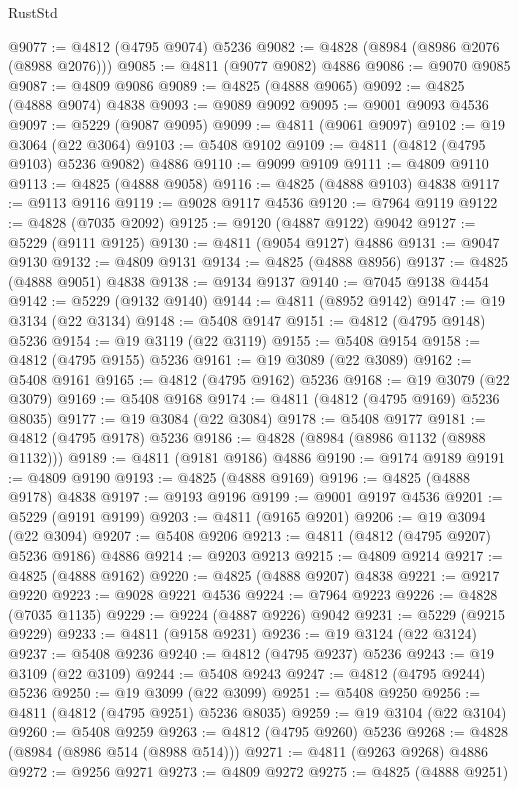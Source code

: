 \begin{lexlean}{RustStd}
\begin{coremodule}
@9077 := @4812 (@4795 @9074) @5236
@9082 := @4828 (@8984 (@8986 @2076 (@8988 @2076)))
@9085 := @4811 (@9077 @9082) @4886
@9086 := @9070 @9085
@9087 := @4809 @9086
@9089 := @4825 (@4888 @9065)
@9092 := @4825 (@4888 @9074) @4838
@9093 := @9089 @9092
@9095 := @9001 @9093 @4536
@9097 := @5229 (@9087 @9095)
@9099 := @4811 (@9061 @9097)
@9102 := @19 @3064 (@22 @3064)
@9103 := @5408 @9102
@9109 := @4811 (@4812 (@4795 @9103) @5236 @9082) @4886
@9110 := @9099 @9109
@9111 := @4809 @9110
@9113 := @4825 (@4888 @9058)
@9116 := @4825 (@4888 @9103) @4838
@9117 := @9113 @9116
@9119 := @9028 @9117 @4536
@9120 := @7964 @9119
@9122 := @4828 (@7035 @2092)
@9125 := @9120 (@4887 @9122) @9042
@9127 := @5229 (@9111 @9125)
@9130 := @4811 (@9054 @9127) @4886
@9131 := @9047 @9130
@9132 := @4809 @9131
@9134 := @4825 (@4888 @8956)
@9137 := @4825 (@4888 @9051) @4838
@9138 := @9134 @9137
@9140 := @7045 @9138 @4454
@9142 := @5229 (@9132 @9140)
@9144 := @4811 (@8952 @9142)
@9147 := @19 @3134 (@22 @3134)
@9148 := @5408 @9147
@9151 := @4812 (@4795 @9148) @5236
@9154 := @19 @3119 (@22 @3119)
@9155 := @5408 @9154
@9158 := @4812 (@4795 @9155) @5236
@9161 := @19 @3089 (@22 @3089)
@9162 := @5408 @9161
@9165 := @4812 (@4795 @9162) @5236
@9168 := @19 @3079 (@22 @3079)
@9169 := @5408 @9168
@9174 := @4811 (@4812 (@4795 @9169) @5236 @8035)
@9177 := @19 @3084 (@22 @3084)
@9178 := @5408 @9177
@9181 := @4812 (@4795 @9178) @5236
@9186 := @4828 (@8984 (@8986 @1132 (@8988 @1132)))
@9189 := @4811 (@9181 @9186) @4886
@9190 := @9174 @9189
@9191 := @4809 @9190
@9193 := @4825 (@4888 @9169)
@9196 := @4825 (@4888 @9178) @4838
@9197 := @9193 @9196
@9199 := @9001 @9197 @4536
@9201 := @5229 (@9191 @9199)
@9203 := @4811 (@9165 @9201)
@9206 := @19 @3094 (@22 @3094)
@9207 := @5408 @9206
@9213 := @4811 (@4812 (@4795 @9207) @5236 @9186) @4886
@9214 := @9203 @9213
@9215 := @4809 @9214
@9217 := @4825 (@4888 @9162)
@9220 := @4825 (@4888 @9207) @4838
@9221 := @9217 @9220
@9223 := @9028 @9221 @4536
@9224 := @7964 @9223
@9226 := @4828 (@7035 @1135)
@9229 := @9224 (@4887 @9226) @9042
@9231 := @5229 (@9215 @9229)
@9233 := @4811 (@9158 @9231)
@9236 := @19 @3124 (@22 @3124)
@9237 := @5408 @9236
@9240 := @4812 (@4795 @9237) @5236
@9243 := @19 @3109 (@22 @3109)
@9244 := @5408 @9243
@9247 := @4812 (@4795 @9244) @5236
@9250 := @19 @3099 (@22 @3099)
@9251 := @5408 @9250
@9256 := @4811 (@4812 (@4795 @9251) @5236 @8035)
@9259 := @19 @3104 (@22 @3104)
@9260 := @5408 @9259
@9263 := @4812 (@4795 @9260) @5236
@9268 := @4828 (@8984 (@8986 @514 (@8988 @514)))
@9271 := @4811 (@9263 @9268) @4886
@9272 := @9256 @9271
@9273 := @4809 @9272
@9275 := @4825 (@4888 @9251)

\end{coremodule}
\end{lexlean}
